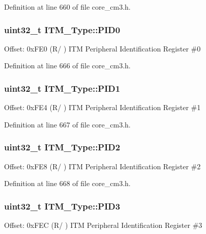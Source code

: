 Definition at line 660 of file core\+\_\+cm3.\+h.

\subsubsection[{\texorpdfstring{P\+I\+D0}{PID0}}]{ uint32\+\_\+t I\+T\+M\+\_\+\+Type\+::\+P\+I\+D0}\hypertarget{structITM__Type_ab69ade751350a7758affdfe396517535}{}\label{structITM__Type_ab69ade751350a7758affdfe396517535}
Offset\+: 0x\+F\+E0 (R/ ) I\+TM Peripheral Identification Register \#0 

Definition at line 666 of file core\+\_\+cm3.\+h.

\subsubsection[{\texorpdfstring{P\+I\+D1}{PID1}}]{ uint32\+\_\+t I\+T\+M\+\_\+\+Type\+::\+P\+I\+D1}\hypertarget{structITM__Type_a30e87ec6f93ecc9fe4f135ca8b068990}{}\label{structITM__Type_a30e87ec6f93ecc9fe4f135ca8b068990}
Offset\+: 0x\+F\+E4 (R/ ) I\+TM Peripheral Identification Register \#1 

Definition at line 667 of file core\+\_\+cm3.\+h.

\subsubsection[{\texorpdfstring{P\+I\+D2}{PID2}}]{ uint32\+\_\+t I\+T\+M\+\_\+\+Type\+::\+P\+I\+D2}\hypertarget{structITM__Type_ae139d2e588bb382573ffcce3625a88cd}{}\label{structITM__Type_ae139d2e588bb382573ffcce3625a88cd}
Offset\+: 0x\+F\+E8 (R/ ) I\+TM Peripheral Identification Register \#2 

Definition at line 668 of file core\+\_\+cm3.\+h.

\subsubsection[{\texorpdfstring{P\+I\+D3}{PID3}}]{ uint32\+\_\+t I\+T\+M\+\_\+\+Type\+::\+P\+I\+D3}\hypertarget{structITM__Type_af006ee26c7e61c9a3712a80ac74a6cf3}{}\label{structITM__Type_af006ee26c7e61c9a3712a80ac74a6cf3}
Offset\+: 0x\+F\+EC (R/ ) I\+TM Peripheral Identification Register \#3 

